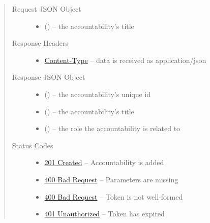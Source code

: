\documentclass[letterpaper,10pt,english]{sphinxmanual}
\begin{document}
\begin{fulllineitems}
\begin{quote}
\begin{description}
\item[{Request JSON Object}] \leavevmode\begin{itemize}
\item {} 
 () -- the accountability's title

\end{itemize}

\item[{Response Headers}] \leavevmode\begin{itemize}
\item {} 
\href{http://tools.ietf.org/html/rfc7231\#section-3.1.1.5}{Content-Type} -- data is received as application/json

\end{itemize}

\item[{Response JSON Object}] \leavevmode\begin{itemize}
\item {} 
 () -- the accountability's unique id

\item {} 
 () -- the accountability's title

\item {} 
 () -- the role the accountability is related to

\end{itemize}

\item[{Status Codes}] \leavevmode\begin{itemize}
\item {} 
\href{http://www.w3.org/Protocols/rfc2616/rfc2616-sec10.html\#sec10.2.2}{201 Created} -- Accountability is added

\item {} 
\href{http://www.w3.org/Protocols/rfc2616/rfc2616-sec10.html\#sec10.4.1}{400 Bad Request} -- Parameters are missing

\item {} 
\href{http://www.w3.org/Protocols/rfc2616/rfc2616-sec10.html\#sec10.4.1}{400 Bad Request} -- Token is not well-formed

\item {} 
\href{http://www.w3.org/Protocols/rfc2616/rfc2616-sec10.html\#sec10.4.2}{401 Unauthorized} -- Token has expired


\end{itemize}
\end{description}
\end{quote}
\end{fulllineitems}
\end{document}
